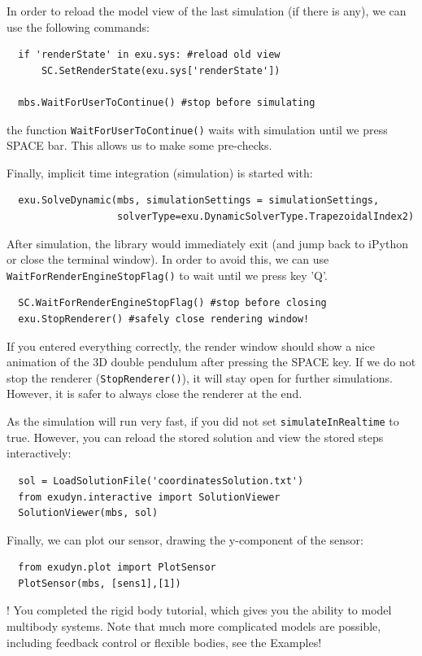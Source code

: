 \noindent In order to reload the model view of the last simulation (if there is any), we can use the following commands:
\pythonstyle\begin{lstlisting}
  if 'renderState' in exu.sys: #reload old view
      SC.SetRenderState(exu.sys['renderState'])

  mbs.WaitForUserToContinue() #stop before simulating
\end{lstlisting}
the function \texttt{WaitForUserToContinue()} waits with simulation until we press SPACE bar. This allows us to make some pre-checks.

\noindent Finally, implicit time integration (simulation) is started with:
\pythonstyle\begin{lstlisting}
  exu.SolveDynamic(mbs, simulationSettings = simulationSettings,
                   solverType=exu.DynamicSolverType.TrapezoidalIndex2)
\end{lstlisting}

\noindent After simulation, the library would immediately exit (and jump back to iPython or close the terminal window). In order to avoid this, we can use \texttt{WaitForRenderEngineStopFlag()} to wait until we press key 'Q'.
\pythonstyle\begin{lstlisting}
  SC.WaitForRenderEngineStopFlag() #stop before closing
  exu.StopRenderer() #safely close rendering window!
\end{lstlisting}
If you entered everything correctly, the render window should show a nice animation of the 3D double pendulum after pressing the SPACE key. 
If we do not stop the renderer (\texttt{StopRenderer()}), it will stay open for further simulations. However, it is safer to always close the renderer at the end.

\noindent As the simulation will run very fast, if you did not set \texttt{simulateInRealtime} to true. However, you can reload the stored solution and view the stored steps interactively:
\pythonstyle\begin{lstlisting}
  sol = LoadSolutionFile('coordinatesSolution.txt')
  from exudyn.interactive import SolutionViewer
  SolutionViewer(mbs, sol)
\end{lstlisting}

\noindent Finally, we can plot our sensor, drawing the y-component of the sensor:
\pythonstyle\begin{lstlisting}
  from exudyn.plot import PlotSensor
  PlotSensor(mbs, [sens1],[1])
\end{lstlisting}

\noindent {}! You completed the rigid body tutorial, which gives you the ability to model multibody systems. Note that much more complicated models are possible, including feedback control or flexible bodies, see the Examples!





